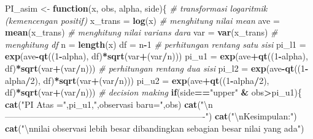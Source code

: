 \documentclass[]{book}
\newenvironment{Shaded}{\begin{snugshade}}{\end{snugshade}}
\newcommand{\KeywordTok}[1]{\textcolor[rgb]{0.13,0.29,0.53}{\textbf{#1}}}
\newcommand{\DecValTok}[1]{\textcolor[rgb]{0.00,0.00,0.81}{#1}}
\newcommand{\CharTok}[1]{\textcolor[rgb]{0.31,0.60,0.02}{#1}}
\newcommand{\StringTok}[1]{\textcolor[rgb]{0.31,0.60,0.02}{#1}}
\newcommand{\CommentTok}[1]{\textcolor[rgb]{0.56,0.35,0.01}{\textit{#1}}}
\newcommand{\ControlFlowTok}[1]{\textcolor[rgb]{0.13,0.29,0.53}{\textbf{#1}}}
\newcommand{\OperatorTok}[1]{\textcolor[rgb]{0.81,0.36,0.00}{\textbf{#1}}}
\newcommand{\NormalTok}[1]{#1}
\begin{document}
\begin{Shaded}
\begin{Highlighting}[]
\NormalTok{PI_asim <-}\StringTok{ }\ControlFlowTok{function}\NormalTok{(x, obs, alpha, side)\{}
  \CommentTok{# transformasi logaritmik (kemencengan positif)}
\NormalTok{  x_trans =}\StringTok{ }\KeywordTok{log}\NormalTok{(x)}
  \CommentTok{# menghitung nilai mean}
\NormalTok{  ave =}\StringTok{ }\KeywordTok{mean}\NormalTok{(x_trans)}
  \CommentTok{# menghitung nilai varians dara}
\NormalTok{  var =}\StringTok{ }\KeywordTok{var}\NormalTok{(x_trans)}
  \CommentTok{# menghitung df}
\NormalTok{  n =}\StringTok{ }\KeywordTok{length}\NormalTok{(x)}
\NormalTok{  df =}\StringTok{ }\NormalTok{n}\OperatorTok{-}\DecValTok{1}
  \CommentTok{# perhitungan rentang satu sisi}
\NormalTok{  pi_l1 =}\StringTok{ }\KeywordTok{exp}\NormalTok{(ave}\OperatorTok{-}\KeywordTok{qt}\NormalTok{((}\DecValTok{1}\OperatorTok{-}\NormalTok{alpha), df)}\OperatorTok{*}\KeywordTok{sqrt}\NormalTok{(var}\OperatorTok{+}\NormalTok{(var}\OperatorTok{/}\NormalTok{n)))}
\NormalTok{  pi_u1 =}\StringTok{ }\KeywordTok{exp}\NormalTok{(ave}\OperatorTok{+}\KeywordTok{qt}\NormalTok{((}\DecValTok{1}\OperatorTok{-}\NormalTok{alpha), df)}\OperatorTok{*}\KeywordTok{sqrt}\NormalTok{(var}\OperatorTok{+}\NormalTok{(var}\OperatorTok{/}\NormalTok{n)))}
  \CommentTok{# perhitungan rentang dua sisi}
\NormalTok{  pi_l2 =}\StringTok{ }\KeywordTok{exp}\NormalTok{(ave}\OperatorTok{-}\KeywordTok{qt}\NormalTok{((}\DecValTok{1}\OperatorTok{-}\NormalTok{alpha}\OperatorTok{/}\DecValTok{2}\NormalTok{), df)}\OperatorTok{*}\KeywordTok{sqrt}\NormalTok{(var}\OperatorTok{+}\NormalTok{(var}\OperatorTok{/}\NormalTok{n)))}
\NormalTok{  pi_u2 =}\StringTok{ }\KeywordTok{exp}\NormalTok{(ave}\OperatorTok{+}\KeywordTok{qt}\NormalTok{((}\DecValTok{1}\OperatorTok{-}\NormalTok{alpha}\OperatorTok{/}\DecValTok{2}\NormalTok{), df)}\OperatorTok{*}\KeywordTok{sqrt}\NormalTok{(var}\OperatorTok{+}\NormalTok{(var}\OperatorTok{/}\NormalTok{n)))}
  \CommentTok{# decision making}
  \ControlFlowTok{if}\NormalTok{(side}\OperatorTok{==}\StringTok{"upper"} \OperatorTok{&}\StringTok{ }\NormalTok{obs}\OperatorTok{>}\NormalTok{pi_u1)\{}
    \KeywordTok{cat}\NormalTok{(}\StringTok{"PI Atas ="}\NormalTok{,pi_u1,}\StringTok{",observasi baru="}\NormalTok{,obs)}
    \KeywordTok{cat}\NormalTok{(}\StringTok{"}\CharTok{\textbackslash{}n}\StringTok{----------------------------------------------------------------------"}\NormalTok{)}
    \KeywordTok{cat}\NormalTok{(}\StringTok{"}\CharTok{\textbackslash{}n}\StringTok{Kesimpulan:"}\NormalTok{)}
    \KeywordTok{cat}\NormalTok{(}\StringTok{"}\CharTok{\textbackslash{}n}\StringTok{nilai observasi lebih besar dibandingkan sebagian besar nilai yang ada"}\NormalTok{)}

\end{Highlighting}
\end{Shaded}
\end{document}
